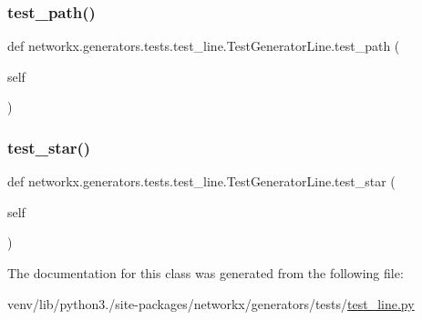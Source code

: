 \subsubsection{\texorpdfstring{test\+\_\+path()}{test\_path()}}
{\footnotesize\ttfamily def networkx.\+generators.\+tests.\+test\+\_\+line.\+Test\+Generator\+Line.\+test\+\_\+path (\begin{DoxyParamCaption}\item[{}]{self }\end{DoxyParamCaption})}

\mbox{\label{classnetworkx_1_1generators_1_1tests_1_1test__line_1_1TestGeneratorLine_aa7de4e08b2c4ec3cd3b2182617e85d07}} 
\subsubsection{\texorpdfstring{test\+\_\+star()}{test\_star()}}
{\footnotesize\ttfamily def networkx.\+generators.\+tests.\+test\+\_\+line.\+Test\+Generator\+Line.\+test\+\_\+star (\begin{DoxyParamCaption}\item[{}]{self }\end{DoxyParamCaption})}



The documentation for this class was generated from the following file\+:\begin{DoxyCompactItemize}
\item 
venv/lib/python3./site-\/packages/networkx/generators/tests/\hyperlink{test__line_8py}{test\+\_\+line.\+py}\end{DoxyCompactItemize}

